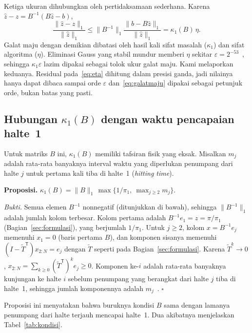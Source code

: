 \documentclass[12pt,a4paper]{article}
\newcommand{\T}{\mathsf{T}}
\numberwithin{equation}{section}
\begin{document}
Ketiga ukuran dihubungkan oleh pertidaksamaan sederhana. Karena $\hat z-z=B^{-1}(B\hat z-b)$,
\begin{equation}\label{eq:galatmaju}
\frac{\lVert\hat z-z\rVert_1}{\lVert\hat z\rVert_1}
\le\lVert B^{-1}\rVert_1\frac{\lVert b-B\hat z\rVert_1}{\lVert\hat z\rVert_1}
=\kappa_1(B)\,\eta .
\end{equation}
Galat maju dengan demikian dibatasi oleh hasil kali sifat masalah ($\kappa_1$) dan sifat algoritma ($\eta$). Eliminasi
Gauss yang stabil mundur memberi $\eta$ sekitar $\varepsilon=2^{-53}$~\cite{higham}, sehingga $\kappa_1\varepsilon$
lazim dipakai sebagai tolok ukur galat maju. Kami melaporkan keduanya. Residual pada~\eqref{eq:eta} dihitung dalam presisi
ganda, jadi nilainya hanya dapat dibaca sampai orde $\varepsilon$ dan~\eqref{eq:galatmaju} dipakai sebagai petunjuk orde,
bukan batas yang pasti.

\subsection{Hubungan $\kappa_1(B)$ dengan waktu pencapaian halte~1}
Untuk matriks $B$ ini, $\kappa_1(B)$ memiliki tafsiran fisik yang eksak. Misalkan $m_j$ adalah rata-rata banyaknya
interval waktu yang diperlukan penumpang dari halte $j$ untuk pertama kali tiba di halte~1 (\emph{hitting time}).

\medskip\noindent\textbf{Proposisi.}
$\kappa_1(B)=\lVert B\rVert_1\,\max\bigl\{1/\pi_1,\ \max_{j\ge2}m_j\bigr\}$.

\smallskip\noindent\emph{Bukti.}
Semua elemen $B^{-1}$ nonnegatif (ditunjukkan di bawah), sehingga $\lVert B^{-1}\rVert_1$ adalah jumlah kolom terbesar.
Kolom pertama adalah $B^{-1}e_1=z=\pi/\pi_1$ (Bagian~\ref{sec:formulasi}), yang berjumlah $1/\pi_1$. Untuk $j\ge2$, kolom
$x=B^{-1}e_j$ memenuhi $x_1=0$ (baris pertama $B$), dan komponen sisanya memenuhi
$(I-\widetilde T^\T)x_{2:N}=e_j$ dengan $\widetilde T$ seperti pada Bagian~\ref{sec:formulasi}. Karena $\widetilde T^k\to0$,
$x_{2:N}=\sum_{k\ge0}(\widetilde T^\T)^ke_j\ge0$. Komponen ke-$i$ adalah rata-rata banyaknya kunjungan ke halte $i$
sebelum penumpang yang berangkat dari halte $j$ tiba di halte~1, sehingga jumlah komponennya adalah $m_j$~\cite{norris}.
\hfill$\square$

\medskip
Proposisi ini menyatakan bahwa buruknya kondisi $B$ sama dengan lamanya penumpang dari halte terjauh mencapai halte~1.
Dua akibatnya menjelaskan Tabel~\ref{tab:kondisi}.
\end{document}
